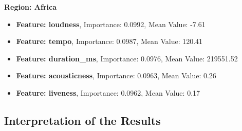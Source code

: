 \textbf{Region: Africa }
\begin{itemize}
    \item \textbf{Feature: loudness}, Importance: 0.0992, Mean Value: -7.61
    \item \textbf{Feature: tempo}, Importance: 0.0987, Mean Value: 120.41
    \item \textbf{Feature: duration\_ms}, Importance: 0.0976, Mean Value: 219551.52
    \item \textbf{Feature: acousticness}, Importance: 0.0963, Mean Value: 0.26
    \item \textbf{Feature: liveness}, Importance: 0.0962, Mean Value: 0.17
\end{itemize}

\subsection{Interpretation of the Results}
